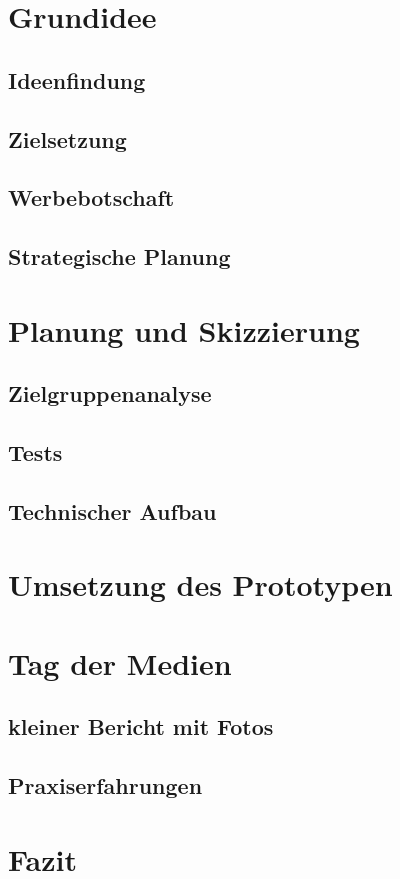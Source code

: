







\tableofcontents


\clearpage
\section{Grundidee}
\subsection{Ideenfindung}
\subsection{Zielsetzung}
\subsection{Werbebotschaft}
\subsection{Strategische Planung}

\clearpage
\section{Planung und Skizzierung}
\subsection{Zielgruppenanalyse}
\subsection{Tests}
\subsection{Technischer Aufbau}

\clearpage
\section{Umsetzung des Prototypen}




%





\clearpage
\section{Tag der Medien}
\subsection{kleiner Bericht mit Fotos}
\subsection{Praxiserfahrungen}

\clearpage

\newpage

\clearpage
\section{Fazit}


